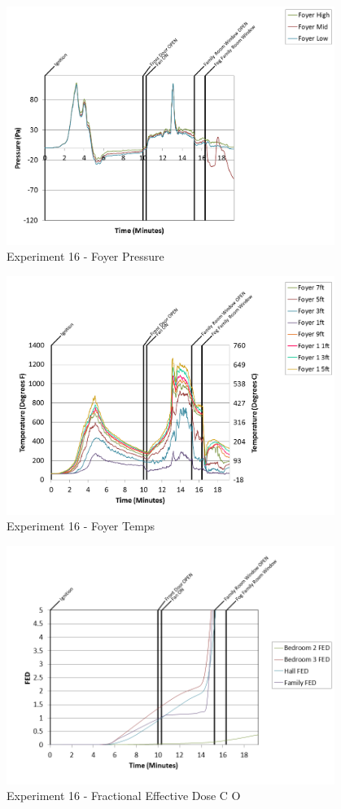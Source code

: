 \documentclass{article}
\begin{document}
\begin{appendices}
\begin{figure}[h!]
	\centering
	\includegraphics[height=3.05in]{0_Images/Results_Charts/Exp_16_Charts/FoyerPressure.png}
	\caption{Experiment 16 - Foyer Pressure}
\end{figure}

\clearpage

\begin{figure}[h!]
	\centering
	\includegraphics[height=3.05in]{0_Images/Results_Charts/Exp_16_Charts/FoyerTemps.png}
	\caption{Experiment 16 - Foyer Temps}
\end{figure}


\begin{figure}[h!]
	\centering
	\includegraphics[height=3.05in]{0_Images/Results_Charts/Exp_16_Charts/FractionalEffectiveDoseCO.png}
	\caption{Experiment 16 - Fractional Effective Dose C O}
\end{figure}


\end{appendices}
\end{document}
